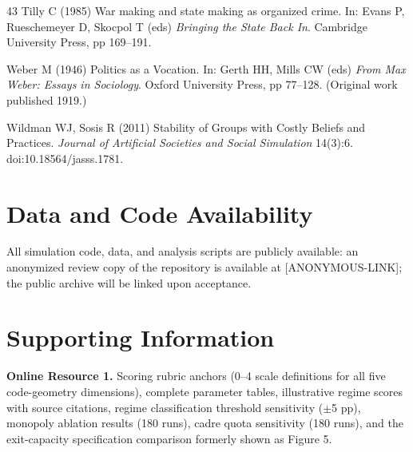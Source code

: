\documentclass[12pt]{article}
\begin{document}
\begin{thebibliography}{43}
Tilly C (1985) War making and state making as organized crime. In: Evans P, Rueschemeyer D, Skocpol T (eds) \textit{Bringing the State Back In}. Cambridge University Press, pp 169--191.

Weber M (1946) Politics as a Vocation. In: Gerth HH, Mills CW (eds) \textit{From Max Weber: Essays in Sociology}. Oxford University Press, pp 77--128. (Original work published 1919.)

Wildman WJ, Sosis R (2011) Stability of Groups with Costly Beliefs and Practices. \textit{Journal of Artificial Societies and Social Simulation} 14(3):6. doi:10.18564/jasss.1781.

\end{thebibliography}

\section*{Data and Code Availability}

All simulation code, data, and analysis scripts are publicly available: an anonymized review copy of the repository is available at [ANONYMOUS-LINK]; the public archive will be linked upon acceptance.

\section*{Supporting Information}

\noindent\textbf{Online Resource 1.} Scoring rubric anchors (0--4 scale definitions for all five code-geometry dimensions), complete parameter tables, illustrative regime scores with source citations, regime classification threshold sensitivity ($\pm$5 pp), monopoly ablation results (180 runs), cadre quota sensitivity (180 runs), and the exit-capacity specification comparison formerly shown as Figure 5.
\end{document}
